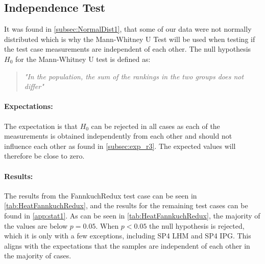 

\subsection{Independence Test}\label{subsec:independence1}

 It was found in \cref{subsec:NormalDist1}, that some of our data were not normally distributed which is why the Mann-Whitney U Test will be used when testing if the test case measurements are independent of each other. The null hypothesis $H_0$ for the Mann-Whitney U test is defined as:

\begin{quote}
    \textit{"In the population, the sum of the rankings in the two groups does not differ"}\cite[]{mann1947test}
\end{quote}

\paragraph{Expectations:} The expectation is that $H_0$ can be rejected in all cases as each of the measurements is obtained independently from each other and should not influence each other as found in \cref{subsec:exp_r3}. The expected values will therefore be close to zero.

\paragraph{Results:}
The results from the FannkuchRedux test case can be seen in \cref{tab:HeatFannkuchRedux}, and the results for the remaining test cases can be found in \cref{app:stat1}. As can be seen in \cref{tab:HeatFannkuchRedux}, the majority of the values are below $p = 0.05$. When $p < 0.05$ the null hypothesis is rejected, which it is only with a few exceptions, including SP4 LHM and SP4 IPG. This aligns with the expectations that the samples are independent of each other in the majority of cases.

 


